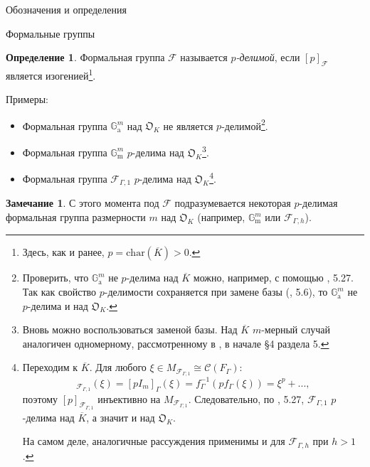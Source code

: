 \documentclass[a4paper,14pt]{extarticle}
\theoremstyle{definition}
\newtheorem{definition}{Определение}[section]
\newtheorem{remark}{Замечание}[section]
\newcommand{\fchar}[1]{\mathrm{char}\left(#1\right)}
\newcommand{\bG}{\mathbb{G}}
\newcommand{\fO}{\mathfrak{O}}
\newcommand{\sC}{\mathscr{C}}
\newcommand{\sF}{\mathscr{F}}
\newcommand{\Ga}{\bG_{\mathrm{a}}}
\newcommand{\Gm}{\bG_{\mathrm{m}}}
\begin{document}
\begin{section}{Обозначения и определения}
\begin{subsection}{Формальные группы}
\begin{definition}\label{def:3.5:p-divisible_formal_group}
    Формальная группа $\sF$ называется \textit{$p$-делимой}, если $[p]_\sF$ является изогенией\footnote{
        Здесь, как и ранее, ${ p = \fchar{\overline{K}} > 0 }$.
    }.
\end{definition}

Примеры:
\begin{itemize}
    \item Формальная группа $\Ga^m$ над $\fO_K$ не является $p$-делимой\footnote{
        Проверить, что $\Ga^m$ не $p$-делима над $\overline{K}$ можно, например, с помощью \cite{Zink}, 5.27. Так как свойство $p$-делимости сохраняется при замене базы (\cite{Zink}, 5.6), то $\Ga^m$ не $p$-делима и над $\fO_K$.
    }.
    \item Формальная группа $\Gm^m$ $p$-делима над $\fO_K$\footnote{
        Вновь можно воспользоваться заменой базы. Над $\overline{K}$ $m$-мерный случай аналогичен одномерному, рассмотренному в \cite{Zink}, в начале \S 4 раздела 5.
    }.
    \item Формальная группа $\sF_{\Gamma, 1}$ $p$-делима над $\fO_K$\footnote{
        Переходим к $\overline{K}$. Для любого ${ \xi \in M_{\sF_{\Gamma, 1}} \cong \sC(F_\Gamma) }$:
        \begin{equation*}
            [p]_{\sF_{\Gamma, 1}}(\xi) =
            [p I_m]_\Gamma(\xi) =
            f_\Gamma^{-1}(p f_\Gamma(\xi)) =
            \xi^p + ...,
        \end{equation*}
        поэтому $[p]_{\sF_{\Gamma, 1}}$ инъективно на $M_{\sF_{\Gamma, 1}}$. Следовательно, по \cite{Zink}, 5.27, $\sF_{\Gamma, 1}$ $p$-делима над $\overline{K}$, а значит и над $\fO_K$.

        На самом деле, аналогичные рассуждения применимы и для $\sF_{\Gamma, h}$ при ${ h > 1 }$.
    }.
\end{itemize}

\begin{remark}\label{remark:3.after_p-divisible:sF}
   С этого момента под $\sF$ подразумевается некоторая $p$-делимая формальная группа размерности $m$ над $\fO_K$ (например, $\Gm^m$ или $\sF_{\Gamma, h}$).
\end{remark}


\end{subsection}
\end{section}
\end{document}
